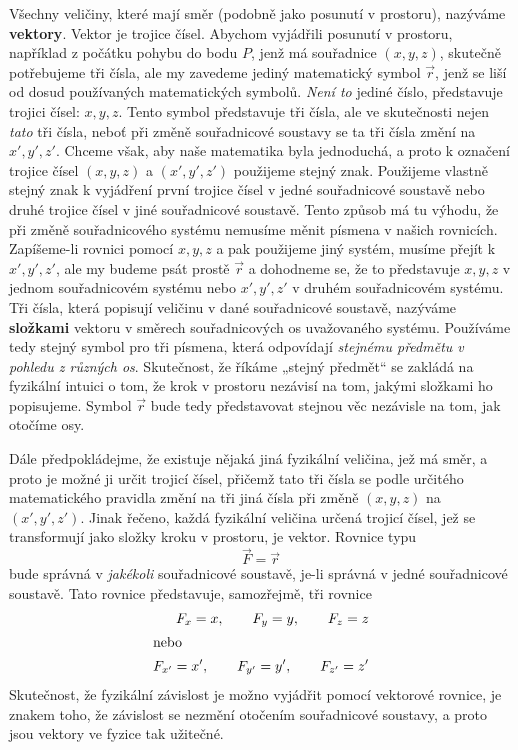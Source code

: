     Všechny veličiny, které mají směr (podobně jako posunutí v prostoru), nazýváme 
    \textbf{vektory}. Vektor je trojice čísel. Abychom vyjádřili posunutí v prostoru, například z 
    počátku pohybu do bodu \(P\), jenž má souřadnice \((x, y, z)\), skutečně potřebujeme tři čísla, 
    ale my zavedeme jediný matematický symbol \(\vec{r}\), jenž se liší od dosud používaných 
    matematických symbolů. \emph{Není to} jediné číslo, představuje trojici čísel: \(x, y, z\). 
    Tento symbol představuje tři čísla, ale ve skutečnosti nejen \emph{tato} tři čísla, neboť při 
    změně souřadnicové soustavy se ta tři čísla změní na \(x', y', z'\). Chceme však, aby naše 
    matematika byla jednoduchá, a proto k označení trojice čísel \((x, y, z)\) a \((x', y', z')\) 
    použijeme stejný znak. Použijeme vlastně stejný znak k vyjádření první trojice čísel v jedné 
    souřadnicové soustavě nebo druhé trojice čísel v jiné souřadnicové soustavě. Tento způsob má tu 
    výhodu, že při změně souřadnicového systému nemusíme měnit písmena v našich rovnicích. 
    Zapíšeme-li rovnici pomocí \(x, y, z\) a pak použijeme jiný systém, musíme přejít k \(x', y', 
    z'\), ale my budeme psát prostě \(\vec{r}\) a dohodneme se, že to představuje \(x, y, z\) v 
    jednom souřadnicovém systému nebo \(x', y', z'\) v druhém souřadnicovém systému. Tři čísla, 
    která popisují veličinu v dané souřadnicové soustavě, nazýváme \textbf{složkami} vektoru v 
    směrech souřadnicových os uvažovaného systému. Používáme tedy stejný symbol pro tři písmena, 
    která odpovídají \emph{stejnému předmětu v pohledu z různých os}. Skutečnost, že říkáme „stejný 
    předmět“ se zakládá na fyzikální intuici o tom, že krok v prostoru nezávisí na tom, jakými 
    složkami ho popisujeme. Symbol \(\vec{r}\) bude tedy představovat stejnou věc nezávisle na tom, 
    jak otočíme osy.
    
    Dále předpokládejme, že existuje nějaká jiná fyzikální veličina, jež má směr, a proto je možné 
    ji určit trojicí čísel, přičemž tato tři čísla se podle určitého matematického pravidla změní 
    na tři jiná čísla při změně \((x, y, z)\) na \((x', y', z')\). Jinak řečeno, každá fyzikální 
    veličina určená trojicí čísel, jež se transformují jako složky kroku v prostoru, je vektor. 
    Rovnice typu
    \begin{equation*}
     \vec{F} = \vec{r}
    \end{equation*}
    bude správná v \emph{jakékoli} souřadnicové soustavě, je-li správná v jedné souřadnicové 
    soustavě. Tato rovnice představuje, samozřejmě, tři rovnice
    \begin{align*}
      F_x = x,     \qquad F_y = y,     \qquad F_z = z       \\
      \shortintertext{nebo}
      F_{x'} = x', \qquad F_{y'} = y', \qquad F_{z'} = z'   \\
    \end{align*}
    Skutečnost, že fyzikální závislost je možno vyjádřit pomocí vektorové rovnice, je znakem toho, 
    že závislost se nezmění otočením souřadnicové soustavy, a proto jsou vektory ve fyzice tak 
    užitečné.
    
